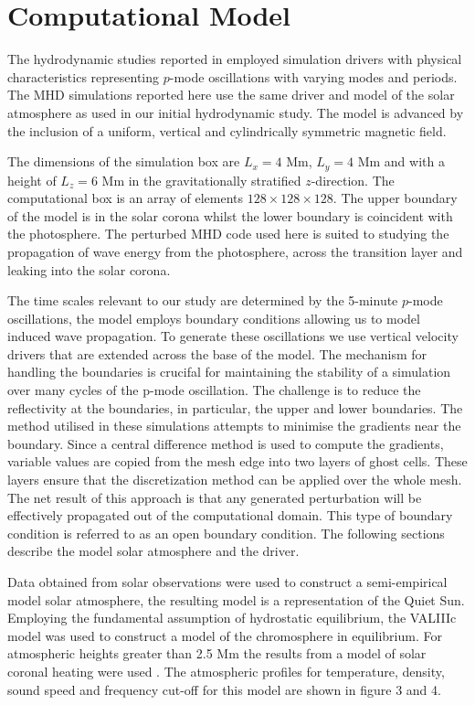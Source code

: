 \documentclass[physics,article,submit,pdftex,moreauthors]{Definitions/mdpi}
\begin{document}
\section{Computational Model}
The hydrodynamic studies reported in  \cite{Griffiths2018b} employed simulation drivers with physical characteristics representing $p$-mode oscillations with varying modes and periods. The MHD simulations reported here use the same driver and model of the solar atmosphere as used in our initial hydrodynamic study. The model is  advanced by the inclusion of a uniform, vertical and cylindrically symmetric magnetic field. 

 The dimensions of the simulation box are $L_{ x}= 4$ Mm,  $L_{y} =4$ Mm and with a height of $L_{z} =6$ Mm in the gravitationally stratified $z$-direction. The computational box is an array of elements $128 \times128 \times128 $. The upper boundary of the model is in the solar corona whilst the lower boundary is coincident with the photosphere. The perturbed MHD code used here is suited to studying the propagation of wave energy from the photosphere, across the transition layer and leaking into the solar corona. 
 
The time scales relevant to our study are determined by the 5-minute $p$-mode oscillations, the model employs boundary conditions allowing us to model induced wave propagation. To generate these oscillations we use vertical velocity drivers  that are extended across the base of the model. The mechanism for handling the boundaries is cruciƒal for maintaining the stability of a simulation over many cycles of the p-mode oscillation. The challenge is to reduce the reflectivity at the boundaries, in particular, the upper and lower boundaries. The method utilised in these simulations attempts to minimise the gradients near the boundary. Since a central difference method is used to compute the gradients, variable values are copied from the mesh edge into two layers of ghost cells. These layers ensure that the discretization method can be applied over the whole mesh. The net result of this approach is that any generated perturbation will be effectively propagated out of the computational domain. This type of boundary condition is referred to as an open boundary condition. The following sections describe the model solar atmosphere and the driver.

Data obtained from solar observations were used to construct a semi-empirical model solar atmosphere, the resulting model is a representation of the Quiet Sun. Employing the fundamental assumption of hydrostatic equilibrium, the VALIIIc model \cite{Vernazza1981} was used to construct a model of the chromosphere in equilibrium. For atmospheric heights greater than 2.5 Mm the results from a model of solar coronal heating were used \cite{McWhirter1975}. The atmospheric profiles for temperature, density, sound speed and frequency cut-off for this model are shown in figure 3 and 4.
\end{document}
